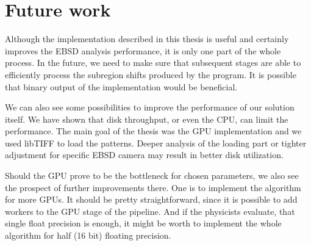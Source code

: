 \section*{Future work}

Although the implementation described in this thesis is useful and certainly improves the EBSD analysis performance, it is only one part of the whole process. In the future, we need to make sure that subsequent stages are able to efficiently process the subregion shifts produced by the program. It is possible that binary output of the implementation would be beneficial.

We can also see some possibilities to improve the performance of our solution itself. We have shown that disk throughput, or even the CPU, can limit the performance. The main goal of the thesis was the GPU implementation and we used libTIFF to load the patterns. Deeper analysis of the loading part or tighter adjustment for specific EBSD camera may result in better disk utilization.

Should the GPU prove to be the bottleneck for chosen parameters, we also see the prospect of further improvements there. One is to implement the algorithm for more GPUs. It should be pretty straightforward, since it is possible to add workers to the GPU stage of the pipeline. And if the physicists evaluate, that single float precision is enough, it might be worth to implement the whole algorithm for half (16 bit) floating precision. 
